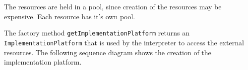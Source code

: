 \documentclass[11pt,a4paper]{article}
\begin{document}
The resources are held in a pool, since creation of the resources may be
expensive. Each resource has it's own pool. 

The factory method \texttt{getImplementationPlatform} returns an
\texttt{Imple\-men\-tationPlatform} that is used by the interpreter to access the
external resources. The following sequence diagram shows the creation of
the implementation platform.

\begin{center}
\end{center}
\end{document}
